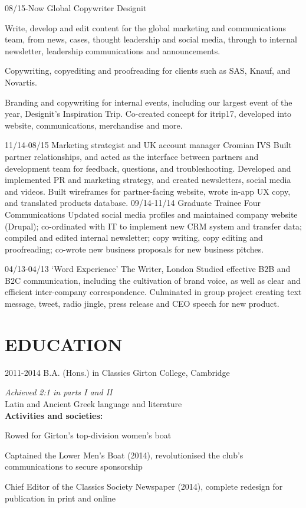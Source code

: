 \documentclass[]{friggeri-cv}
\begin{document}
\begin{entrylist}
	\entry
	{08/15-Now}
	{Global Copywriter}
	{Designit}
	{
		Write, develop and edit content for the global marketing and communications team, from news, cases, thought leadership and social media, through to internal newsletter, leadership communications and announcements.

		Copywriting, copyediting and proofreading for clients such as SAS, Knauf, and Novartis.

		Branding and copywriting for internal events, including our largest event of the year, Designit's Inspiration Trip. Co-created concept for itrip17, developed into website, communications, merchandise and more.
	}
	\entry
	{11/14-08/15}
	{Marketing strategist and UK account manager}
	{Cromian IVS}
	{
		Built partner relationships, and acted as the interface between	partners and development team for feedback, questions, and troubleshooting. Developed and implemented PR and marketing strategy, and created newsletters, social media and videos. Built wireframes for partner-facing website, wrote in-app UX copy, and translated products database.
	}
	\entry
	{09/14-11/14}
	{Graduate Trainee}
	{Four Communications}
	{
		Updated social media profiles and maintained company website (Drupal); co-ordinated with IT to implement new CRM system and transfer data; compiled and edited internal newsletter; copy writing, copy editing and proofreading; co-wrote new business proposals for new business pitches.
	}
\end{entrylist}
\begin{entrylist}
	\entry
	{04/13-04/13}
	{‘Word Experience’}
	{The Writer, London}
	{
		Studied effective B2B and B2C communication, including the cultivation of brand voice, as well as clear and efficient inter-company correspondence. Culminated in group project creating text message, tweet, radio jingle, press release and CEO speech for new product.
	}
\end{entrylist}

\pagebreak

\section{EDUCATION}

\begin{entrylist}
	\entry
	{2011-2014}
	{B.A. (Hons.) in Classics}
	{Girton College, Cambridge}
	{\emph{Achieved 2:1 in parts I and II}
		\\

		Latin and Ancient Greek language and literature
		\\

		\textbf{Activities and societies:}

		Rowed for Girton's top-division women's boat

		Captained the Lower Men's Boat (2014), revolutionised the club's communications to secure sponsorship

		Chief Editor of the Classics Society Newspaper (2014), complete redesign for publication in print and online
	}
\end{entrylist}
\end{document}

